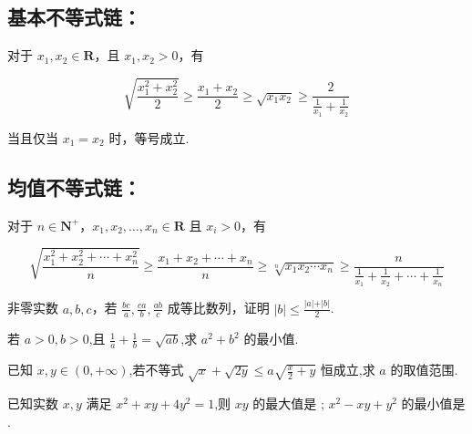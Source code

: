 \documentclass[a4paper , final]{ctexart}
\newenvironment{problem}[1]{%
  \item #1
  \par
  \vspace{8cm}
}{}
\begin{document}
\subsection*{基本不等式链：}

对于 $x_1,x_2\in\mathbf{R}$，且 $x_1,x_2>0$，有

$$
\sqrt{\frac{x_1^2+x_2^2}{2}}\geq \frac{x_1+x_2}{2} \geq \sqrt{x_1x_2} \geq\frac{2}{\frac{1}{x_1}+\frac{1}{x_2}} 
$$

当且仅当 $x_1=x_2$ 时，等号成立.

\subsection*{均值不等式链：}

对于 $n\in\mathbf{N}^+$，$x_1,x_2,\ldots,x_n\in\mathbf{R}$ 且 $x_i>0$，有

$$
\sqrt{\frac{x_1^2+x_2^2+\cdots+x_n^2}{n}} \geq \frac{x_1+x_2+\cdots+x_n}{n} \geq \sqrt[n]{x_1x_2\cdots x_n}\geq \frac{n}{\frac{1}{x_1}+\frac{1}{x_2}+\cdots+\frac{1}{x_n}}
$$

\begin{problems}
  \begin{problem}
    {
      非零实数 $a,b,c$，若 $\frac{bc}{a},\frac{ca}{b},\frac{ab}{c}$ 成等比数列，证明 $\vert b\vert\leq \frac{\vert a \vert +\vert b\vert}{2}$.
    }
  \end{problem}

  \begin{problem}
    {
      若 $a>0,b>0$,且 $\frac{1}{a}+\frac{1}{b} =\sqrt{ab}$,求 $a^2+b^2$ 的最小值.
    }
  \end{problem}

  \begin{problem}
    {
      已知 $x,y\in(0,+\infty)$,若不等式 $\sqrt{x}+\sqrt{2y}\leq a\sqrt{\frac{x}{2}+y}$ 恒成立,求 $a$ 的取值范围.
    }
  \end{problem}

  \begin{problem}
    {
      已知实数 $x,y$ 满足 $x^2+xy+4y^2=1$,则 $xy$ 的最大值是 \underline{\hspace{2cm}}; $x^2-xy+y^2$ 的最小值是 \underline{\hspace{2cm}}.
    }
  \end{problem}
\end{problems}
\end{document}
